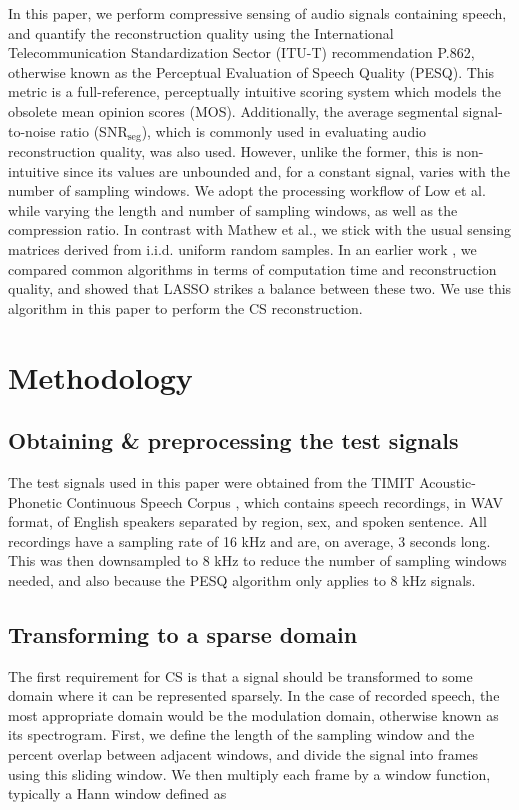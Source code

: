 \documentclass[10pt,a4paper,twoside]{article}
\newcommand{\snrseg}{SNR$_{\mathrm{seg}}$}
\begin{document}
In this paper, we perform compressive sensing of audio signals containing speech, and quantify the reconstruction quality using the International Telecommunication Standardization Sector (ITU-T) recommendation P.862, otherwise known as the Perceptual Evaluation of Speech Quality (PESQ). This metric is a full-reference, perceptually intuitive scoring system which models the obsolete mean opinion scores (MOS). Additionally, the average segmental signal-to-noise ratio (\snrseg), which is commonly used in evaluating audio reconstruction quality, was also used. However, unlike the former, this is non-intuitive since its values are unbounded and, for a constant signal, varies with the number of sampling windows. We adopt the processing workflow of Low et al. while varying the length and number of sampling windows, as well as the compression ratio. In contrast with Mathew et al., we stick with the usual sensing matrices derived from i.i.d. uniform random samples. In an earlier work \cite{Domingo2019}, we compared common algorithms in terms of computation time and reconstruction quality, and showed that LASSO strikes a balance between these two. We use this algorithm in this paper to perform the CS reconstruction.


\section{Methodology}\label{sec:metho}

\subsection{Obtaining \& preprocessing the test signals}\label{ssec:timit}
The test signals used in this paper were obtained from the TIMIT Acoustic-Phonetic Continuous Speech Corpus \cite{timit}, which contains speech recordings, in WAV format, of English speakers separated by region, sex, and spoken sentence. All recordings have a sampling rate of 16 kHz and are, on average, 3 seconds long. This was then downsampled to 8 kHz to reduce the number of sampling windows needed, and also because the PESQ algorithm only applies to 8 kHz signals.

\subsection{Transforming to a sparse domain}\label{ssec:sparse}
The first requirement for CS is that a signal should be transformed to some domain where it can be represented sparsely. In the case of recorded speech, the most appropriate domain would be the modulation domain, otherwise known as its spectrogram. First, we define the length of the sampling window and the percent overlap between adjacent windows, and divide the signal into frames using this sliding window. We then multiply each frame by a window function, typically a Hann window defined as
\end{document}
